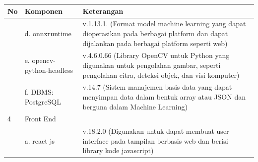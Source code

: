 \begin{singlespace}
	\begin{table}[H]
		\centering
		\begin{tabular}{|p{1cm}|p{4cm}|p{7cm}|}
			\hline
			\rowcolor[HTML]{D9D9D9} 
			No                 & Komponen                  & Keterangan                                                                                                                                                                                                                                                                                                                                        \\ \hline
			& d. onnxruntime            & v.1.13.1. (Format model machine learning yang dapat dioperasikan pada berbagai platform dan dapat dijalankan pada berbagai platform seperti web)                                                                                                                                                                                                  \\ \cline{2-3} 
			& e. opencv-python-headless & v.4.6.0.66 (Library OpenCV untuk Python yang digunakan untuk pengolahan gambar, seperti pengolahan citra, deteksi objek, dan visi komputer)                                                                                                                                                                                                       \\ \cline{2-3} 
			\multirow{-6}{*}{} & f. DBMS: PostgreSQL       & v.14.7 (Sistem manajemen basis data yang dapat menyimpan data dalam bentuk array atau JSON dan berguna dalam Machine Learning)                                                                                                                                                                                                                    \\ \hline
			4                  & Front End                 &                                                                                                                                                                                                                                                                                                                                                   \\ \hline
			& a. react js               & v.18.2.0 (Digunakan untuk dapat membuat user interface pada tampilan berbasis web dan berisi library kode javascript)                                                                                                                                                                                                                             \\ \cline{2-3} 

\end{tabular}
\end{table}
\end{singlespace}
